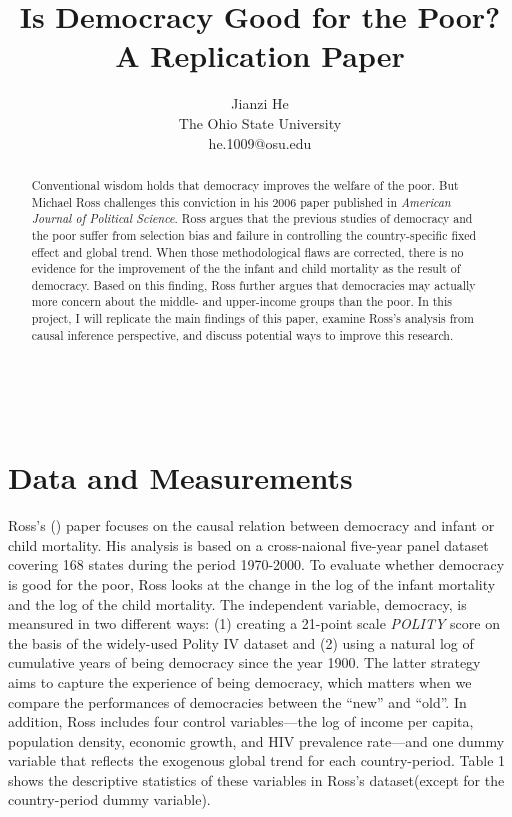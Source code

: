 \documentclass[12pt, lelterpaper, reqno]{article}\usepackage[]{graphicx}\usepackage[]{color}
\title{\textbf{Is Democracy Good for the Poor?\\A Replication Paper}}
\author{Jianzi He\\The Ohio State University\\he.1009@osu.edu}
\begin{document}
\begin{titlepage}
\maketitle

\doublespacing
\
\
\begin{abstract}
Conventional wisdom holds that democracy improves the welfare of the poor. But Michael Ross challenges this conviction in his 2006 paper published in \textit{American Journal of Political Science}. Ross argues that the previous studies of democracy and the poor suffer from selection bias and failure in controlling the country-specific fixed effect and global trend. When those methodological flaws are corrected, there is no evidence for the improvement of the the infant and child mortality as the result of democracy. Based on this finding, Ross further argues that democracies may actually more concern about the middle- and upper-income groups than the poor. In this project, I will replicate the main findings of this paper, examine Ross's analysis from causal inference perspective, and discuss potential ways to improve this research.
\end{abstract}

\end{titlepage}


\section{Data and Measurements}
Ross's (\citeyear{ross2006democracy}) paper focuses on the causal relation between democracy and infant or child mortality. His analysis is based on a cross-naional five-year panel dataset covering 168 states during the period 1970-2000. To evaluate whether democracy is good for the poor, Ross looks at the change in the log of the infant mortality and the log of the child mortality. The independent variable, democracy, is meansured in two different ways: (1) creating a 21-point scale \textit{POLITY} score on the basis of the widely-used Polity IV dataset and (2) using a natural log of cumulative years of being democracy since the year 1900. The latter strategy aims to capture the experience of being democracy, which matters when we compare the performances of democracies between the ``new'' and ``old''. In addition, Ross includes four control variables---the log of income per capita, population density, economic growth, and HIV prevalence rate---and one dummy variable that reflects the exogenous global trend for each country-period. Table 1 shows the descriptive statistics of these variables in Ross's dataset(except for the country-period dummy variable).
\end{document}
